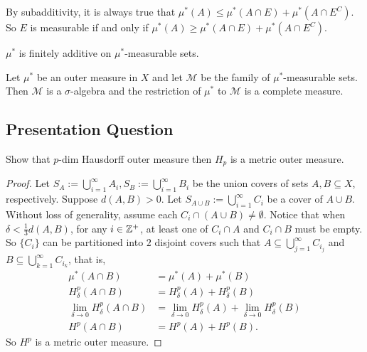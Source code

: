 \documentclass[class=book, crop=false]{standalone}
\begin{document}
        \begin{remark}
            By subadditivity, it is always true that $\mu^*(A) \leq \mu^*(A \cap E) + \mu^*(A \cap E^C)$. So $E$ is measurable if and only if $\mu^*(A) \geq \mu^*(A \cap E) + \mu^*(A \cap E^C)$.
        \end{remark}

        \begin{theorem}
            $\mu^*$ is finitely additive on $\mu^*$-measurable sets.
        \end{theorem}

        \begin{theorem}
            Let $\mu^*$ be an outer measure in $X$ and let $\mathscr{M}$ be the family of $\mu^*$-measurable sets. Then $\mathscr{M}$ is a $\sigma$-algebra and the restriction of $\mu^*$ to $\mathscr{M}$ is a complete measure.
        \end{theorem}
        
        \subsection{Presentation Question}
        \begin{question}
            Show that $p$-dim Hausdorff outer measure then $H_p$ is a metric outer measure.
        \end{question}
        \begin{proof}
            Let $S_A := \bigcup^{\infty}_{i = 1} A_i, S_B := \bigcup^{\infty}_{i = 1} B_i$ be the union covers of sets $A, B \subseteq X$, respectively. Suppose $d(A, B) > 0$. Let $S_{A \cup B} := \bigcup^{\infty}_{i = 1} C_i$ be a cover of $A \cup B$. Without loss of generality, assume each $C_i \cap (A \cup B) \neq \emptyset$. Notice that when $\delta < \frac{1}{3} d(A, B)$, for any $i \in \mathbb{Z}^+$, at least one of $C_i \cap A$ and $C_i \cap B$ must be empty. So $\{C_i\}$ can be partitioned into $2$ disjoint covers such that $A \subseteq \bigcup^{\infty}_{j = 1} C_{i_j}$ and $B \subseteq \bigcup^{\infty}_{k = 1} C_{i_k}$, that is,
            \begin{align*}
                \mu^*(A \cap B) &= \mu^*(A) + \mu^*(B) \\
                H^p_{\delta}(A \cap B) &= H^p_{\delta}(A) + H^p_{\delta}(B) \\
                \lim_{\delta \rightarrow 0} H^p_{\delta}(A \cap B) &= \lim_{\delta \rightarrow 0} H^p_{\delta}(A) + \lim_{\delta \rightarrow 0} H^p_{\delta}(B) \\
                H^p(A \cap B) &= H^p(A) + H^p(B).
            \end{align*}
            So $H^p$ is a metric outer measure.
        \end{proof}
\end{document}
